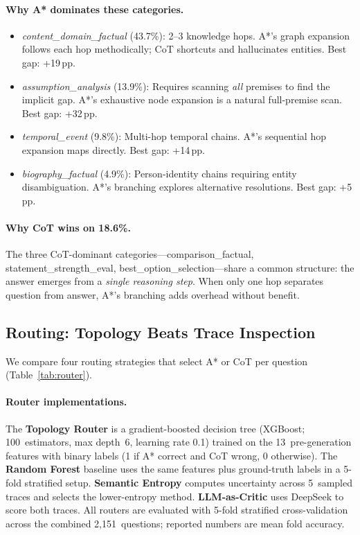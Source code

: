 \documentclass[11pt]{article}
\newcommand{\pp}{\,pp}
\begin{document}
\paragraph{Why A* dominates these categories.}
\begin{itemize}[leftmargin=1.5em,itemsep=3pt]
\item \textit{content\_domain\_factual} (43.7\%): 2--3 knowledge hops. A*'s graph expansion follows each hop methodically; CoT shortcuts and hallucinates entities. Best gap: +19\pp.
\item \textit{assumption\_analysis} (13.9\%): Requires scanning \emph{all} premises to find the implicit gap. A*'s exhaustive node expansion is a natural full-premise scan. Best gap: +32\pp.
\item \textit{temporal\_event} (9.8\%): Multi-hop temporal chains. A*'s sequential hop expansion maps directly. Best gap: +14\pp.
\item \textit{biography\_factual} (4.9\%): Person-identity chains requiring entity disambiguation. A*'s branching explores alternative resolutions. Best gap: +5\pp.
\end{itemize}

\paragraph{Why CoT wins on 18.6\%.}
The three CoT-dominant categories---comparison\_factual, statement\_strength\_eval, best\_option\_selection---share a common structure: the answer emerges from a \emph{single reasoning step}. When only one hop separates question from answer, A*'s branching adds overhead without benefit.

\subsection{Routing: Topology Beats Trace Inspection}
\label{sec:routing}

We compare four routing strategies that select A* or CoT per question (Table~\ref{tab:router}).

\paragraph{Router implementations.}
The \textbf{Topology Router} is a gradient-boosted decision tree (XGBoost; 100~estimators, max depth~6, learning rate 0.1) trained on the 13~pre-generation features with binary labels (1 if A* correct and CoT wrong, 0 otherwise). The \textbf{Random Forest} baseline uses the same features plus ground-truth labels in a 5-fold stratified setup. \textbf{Semantic Entropy} computes uncertainty across 5~sampled traces and selects the lower-entropy method. \textbf{LLM-as-Critic} uses DeepSeek to score both traces. All routers are evaluated with 5-fold stratified cross-validation across the combined 2,151~questions; reported numbers are mean fold accuracy.
\end{document}
